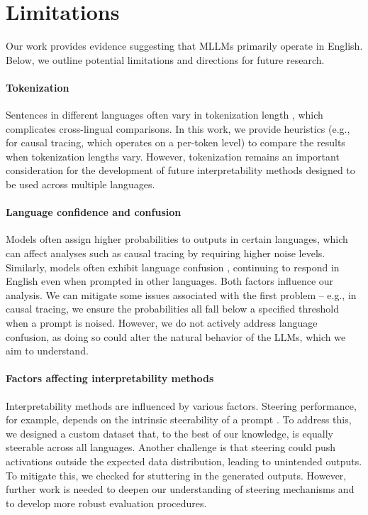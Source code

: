 \section{Limitations}
Our work provides evidence suggesting that MLLMs primarily operate in English.
Below, we outline potential limitations and directions for future research.

\paragraph{Tokenization}
Sentences in different languages often vary in tokenization length \citep{rust-etal-2021-good, muller-etal-2021-unseen,petrov2024language}, which complicates cross-lingual comparisons. 
In this work, we provide heuristics (e.g., for causal tracing, which operates on a per-token level) to compare the results when tokenization lengths vary. 
However, tokenization remains an important consideration for the development of future interpretability methods designed to be used across multiple languages.


\paragraph{Language confidence and confusion}
Models often assign higher probabilities to outputs in certain languages, which can affect analyses such as causal tracing by requiring higher noise levels. Similarly, models often exhibit language confusion \citep{marchisio2024understandingmitigatinglanguageconfusion}, continuing to respond in English even when prompted in other languages. 
Both factors influence our analysis. We can mitigate some issues associated with the first problem -- e.g., in causal tracing, we ensure the probabilities all fall below a specified threshold when a prompt is noised. However, we do not actively address language confusion, as doing so could alter the natural behavior of the LLMs, which we aim to understand.


\paragraph{Factors affecting interpretability methods}
Interpretability methods are influenced by various factors. Steering performance, for example, depends on the intrinsic steerability of a prompt \citep{turner2023activation, tan2024analyzinggeneralizationreliabilitysteering}. To address this, we designed a custom dataset that, to the best of our knowledge, is equally steerable across all languages.
Another challenge is that steering could push activations outside the expected data distribution, leading to unintended outputs. 
To mitigate this, we checked for stuttering in the generated outputs. 
However, further work is needed to deepen our understanding of steering mechanisms and to develop more robust evaluation procedures.

